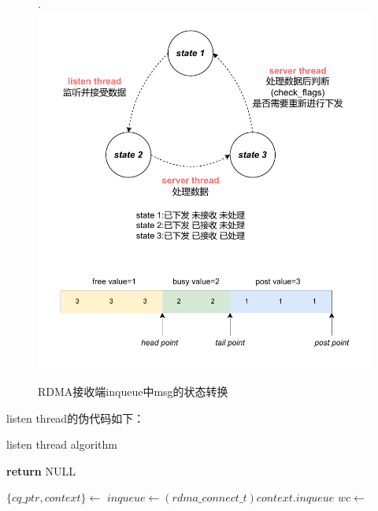 {    \begin{figure}[H]
        \centering
        .    \includegraphics[width=1.0\textwidth]{Img/recv_state.drawio.pdf}
        \caption{RDMA接收端inqueue中msg的状态转换}
    \end{figure}

    listen thread的伪代码如下：
    \begin{algorithm}
        \caption{listen thread algorithm}
        \begin{algorithmic}[1] %
            \State {}
            \State \textbf{return} NULL
            \EndProcedure

            \State $\{ cq\_ptr, context\} \gets$ 
            \State $inqueue \gets (rdma\_connect\_t)context.inqueue$
            \State {}
            \State $wc \gets$ 

            \State
            \State {}
            \Else
            \State {}
            \State {}


\end{algorithmic}
\end{algorithm}}
